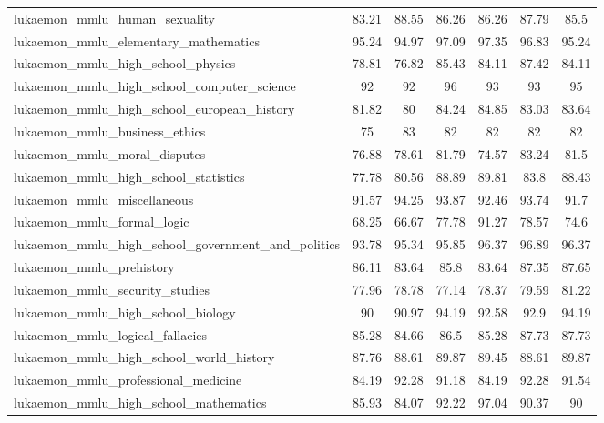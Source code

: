\documentclass{article}
\begin{document}
\begin{table}[htp]
{\begin{tabular}{lcccc>{\columncolor{blue!10}}c>{\columncolor{blue!10}}c}
lukaemon\_mmlu\_human\_sexuality                        & 83.21 & 88.55 & 86.26 & 86.26 & 87.79 & 85.5  \\
lukaemon\_mmlu\_elementary\_mathematics                 & 95.24 & 94.97 & 97.09 & 97.35 & 96.83 & 95.24 \\
lukaemon\_mmlu\_high\_school\_physics                   & 78.81 & 76.82 & 85.43 & 84.11 & 87.42 & 84.11 \\
lukaemon\_mmlu\_high\_school\_computer\_science         & 92    & 92    & 96    & 93    & 93    & 95    \\
lukaemon\_mmlu\_high\_school\_european\_history         & 81.82 & 80    & 84.24 & 84.85 & 83.03 & 83.64 \\
lukaemon\_mmlu\_business\_ethics                        & 75    & 83    & 82    & 82    & 82    & 82    \\
lukaemon\_mmlu\_moral\_disputes                         & 76.88 & 78.61 & 81.79 & 74.57 & 83.24 & 81.5  \\
lukaemon\_mmlu\_high\_school\_statistics                & 77.78 & 80.56 & 88.89 & 89.81 & 83.8  & 88.43 \\
lukaemon\_mmlu\_miscellaneous                           & 91.57 & 94.25 & 93.87 & 92.46 & 93.74 & 91.7  \\
lukaemon\_mmlu\_formal\_logic                           & 68.25 & 66.67 & 77.78 & 91.27 & 78.57 & 74.6  \\
lukaemon\_mmlu\_high\_school\_government\_and\_politics & 93.78 & 95.34 & 95.85 & 96.37 & 96.89 & 96.37 \\
lukaemon\_mmlu\_prehistory                              & 86.11 & 83.64 & 85.8  & 83.64 & 87.35 & 87.65 \\
lukaemon\_mmlu\_security\_studies                       & 77.96 & 78.78 & 77.14 & 78.37 & 79.59 & 81.22 \\
lukaemon\_mmlu\_high\_school\_biology                   & 90    & 90.97 & 94.19 & 92.58 & 92.9  & 94.19 \\
lukaemon\_mmlu\_logical\_fallacies                      & 85.28 & 84.66 & 86.5  & 85.28 & 87.73 & 87.73 \\
lukaemon\_mmlu\_high\_school\_world\_history            & 87.76 & 88.61 & 89.87 & 89.45 & 88.61 & 89.87 \\
lukaemon\_mmlu\_professional\_medicine                  & 84.19 & 92.28 & 91.18 & 84.19 & 92.28 & 91.54 \\
lukaemon\_mmlu\_high\_school\_mathematics               & 85.93 & 84.07 & 92.22 & 97.04 & 90.37 & 90    \\

\end{tabular}}
\end{table}
\end{document}
